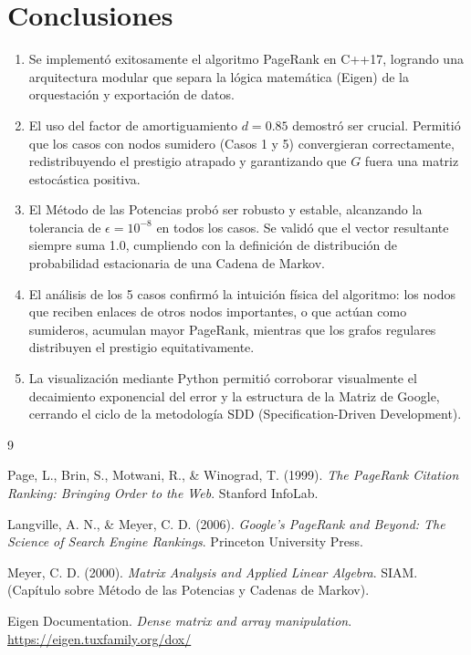 \documentclass[12pt,a4paper]{article}
\theoremstyle{definition}
\begin{document}
\section{Conclusiones}\label{sec:conclusiones}

\begin{enumerate}
    \item Se implement\'{o} exitosamente el algoritmo PageRank en C++17, logrando una arquitectura modular que separa la l\'{o}gica matem\'{a}tica (Eigen) de la orquestaci\'{o}n y exportaci\'{o}n de datos.
    
    \item El uso del factor de amortiguamiento $d = 0.85$ demostr\'{o} ser crucial. Permiti\'{o} que los casos con nodos sumidero (Casos 1 y 5) convergieran correctamente, redistribuyendo el prestigio atrapado y garantizando que $G$ fuera una matriz estoc\'{a}stica positiva.
    
    \item El M\'{e}todo de las Potencias prob\'{o} ser robusto y estable, alcanzando la tolerancia de $\epsilon = 10^{-8}$ en todos los casos. Se valid\'{o} que el vector resultante siempre suma 1.0, cumpliendo con la definici\'{o}n de distribuci\'{o}n de probabilidad estacionaria de una Cadena de Markov.
    
    \item El an\'{a}lisis de los 5 casos confirm\'{o} la intuici\'{o}n f\'{i}sica del algoritmo: los nodos que reciben enlaces de otros nodos importantes, o que act\'{u}an como sumideros, acumulan mayor PageRank, mientras que los grafos regulares distribuyen el prestigio equitativamente.
    
    \item La visualizaci\'{o}n mediante Python permiti\'{o} corroborar visualmente el decaimiento exponencial del error y la estructura de la Matriz de Google, cerrando el ciclo de la metodolog\'{i}a SDD (Specification-Driven Development).
\end{enumerate}

\begin{thebibliography}{9}

 Page, L., Brin, S., Motwani, R., \& Winograd, T. (1999). \textit{The PageRank Citation Ranking: Bringing Order to the Web}. Stanford InfoLab.

 Langville, A. N., \& Meyer, C. D. (2006). \textit{Google's PageRank and Beyond: The Science of Search Engine Rankings}. Princeton University Press.

 Meyer, C. D. (2000). \textit{Matrix Analysis and Applied Linear Algebra}. SIAM. (Cap\'{i}tulo sobre M\'{e}todo de las Potencias y Cadenas de Markov).

 Eigen Documentation. \textit{Dense matrix and array manipulation}. \url{https://eigen.tuxfamily.org/dox/}

\end{thebibliography}
\end{document}
